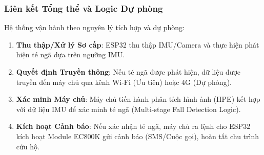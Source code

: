 \subsubsection{Liên kết Tổng thể và Logic Dự phòng}
Hệ thống vận hành theo nguyên lý tích hợp và dự phòng:
\begin{enumerate}
    \item \textbf{Thu thập/Xử lý Sơ cấp}: ESP32 thu thập IMU/Camera và thực hiện phát hiện té ngã dựa trên ngưỡng IMU.
    \item \textbf{Quyết định Truyền thông}: Nếu té ngã được phát hiện, dữ liệu được truyền đến máy chủ qua kênh Wi-Fi (Ưu tiên) hoặc 4G (Dự phòng).
    \item \textbf{Xác minh Máy chủ}: Máy chủ tiến hành phân tích hình ảnh (HPE) kết hợp với dữ liệu IMU để xác minh té ngã (Multi-stage Fall Detection Logic).
    \item \textbf{Kích hoạt Cảnh báo}: Nếu xác nhận té ngã, máy chủ ra lệnh cho ESP32 kích hoạt Module EC800K gửi cảnh báo (SMS/Cuộc gọi), hoàn tất chu trình cứu hộ.
\end{enumerate}
